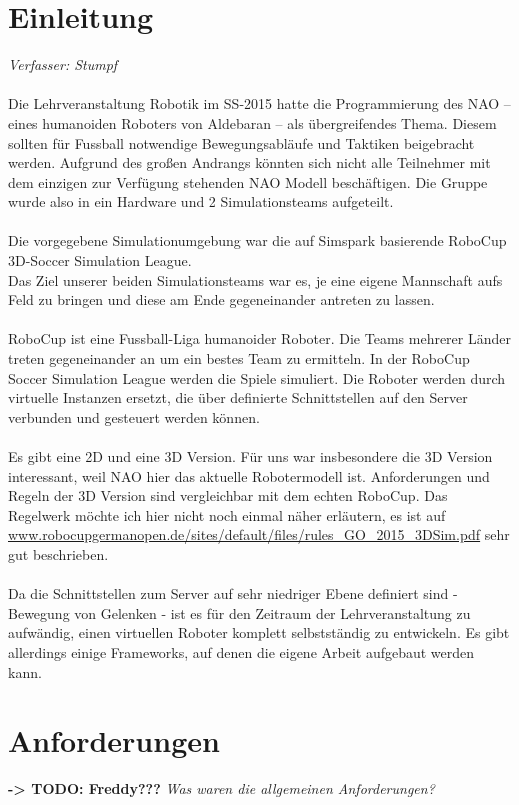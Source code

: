 \documentclass[fontsize=12pt,a4paper,final]{scrartcl}[2003/01/01]
\begin{document}
\section{Einleitung}\label{se:Einleitung}
\textit{Verfasser: Stumpf}\\
\\
Die Lehrveranstaltung Robotik im SS-2015 hatte die Programmierung des NAO -- eines humanoiden Roboters von Aldebaran -- als übergreifendes Thema. Diesem sollten für Fussball notwendige Bewegungsabläufe und Taktiken beigebracht werden. Aufgrund des großen Andrangs könnten sich nicht alle Teilnehmer mit dem einzigen zur Verfügung stehenden NAO Modell beschäftigen. Die Gruppe wurde also in ein Hardware und 2 Simulationsteams aufgeteilt.\\
\\
Die vorgegebene Simulationumgebung war die auf Simspark basierende RoboCup 3D-Soccer Simulation League.\\
Das Ziel unserer beiden Simulationsteams war es, je eine eigene Mannschaft aufs Feld zu bringen und diese am Ende gegeneinander antreten zu lassen.\\
\\
RoboCup ist eine Fussball-Liga humanoider Roboter. Die Teams mehrerer Länder treten gegeneinander an um ein bestes Team zu ermitteln. In der RoboCup Soccer Simulation League werden die Spiele simuliert. Die Roboter werden durch virtuelle Instanzen ersetzt, die über definierte Schnittstellen auf den Server verbunden und gesteuert werden können.\\
\\
Es gibt eine 2D und eine 3D Version. Für uns war insbesondere die 3D Version interessant, weil NAO hier das aktuelle Robotermodell ist. Anforderungen und Regeln der 3D Version sind vergleichbar mit dem echten RoboCup. Das Regelwerk möchte ich hier nicht noch einmal näher erläutern, es ist auf \\
\href{www.robocupgermanopen.de/sites/default/files/rules_GO_2015_3DSim.pdf}{www.robocupgermanopen.de/sites/default/files/rules\_GO\_2015\_3DSim.pdf} sehr gut beschrieben.\\
\\
Da die Schnittstellen zum Server auf sehr niedriger Ebene definiert sind - Bewegung von Gelenken - ist es für den Zeitraum der Lehrveranstaltung zu aufwändig, einen virtuellen Roboter komplett selbstständig zu entwickeln. Es gibt allerdings einige Frameworks, auf denen die eigene Arbeit aufgebaut werden kann.

\section{Anforderungen}
\textbf{-> TODO: Freddy???}
\textit{Was waren die allgemeinen Anforderungen?}
\end{document}
